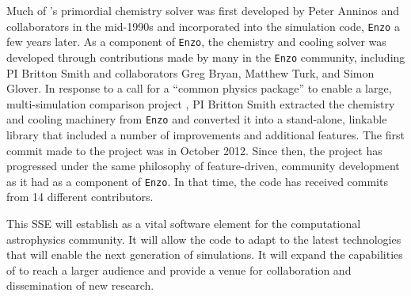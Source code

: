 Much of \grackle{}'s primordial chemistry solver was first developed
by Peter Anninos and collaborators in the mid-1990s
\citep{1997NewA....2..209A, 1997NewA....2..181A} and incorporated into
the simulation code, \texttt{Enzo} \citep[][licensed under the
  3-clause, revised BSD license]{2014ApJS..211...19B} a few
years later.  As a component of \texttt{Enzo}, the chemistry and
cooling solver was developed through contributions made by many in the
\texttt{Enzo} community, including PI Britton Smith and collaborators
Greg Bryan, Matthew Turk, and Simon Glover.  In response to a call for
a ``common physics package'' to enable a large, multi-simulation
comparison project \citep[AGORA,][]{2014ApJS..210...14K,
  2016ApJ...833..202K}, PI Britton Smith extracted the chemistry and
cooling machinery from \texttt{Enzo} and converted it into a
stand-alone, linkable library that included a number of improvements
and additional features.  The first commit made to the \grackle{}
project was in October 2012.  Since then, the project has progressed
under the same philosophy of feature-driven, community development as
it had as a component of \texttt{Enzo}.  In that time, the code has
received commits from 14 different contributors.

This SSE will establish \grackle{} as a vital software element for the
computational astrophysics community.  It will allow the code to adapt
to the latest technologies that will enable the next generation of
simulations.  It will expand the capabilities of \grackle{} to reach a
larger audience and provide a venue for collaboration and
dissemination of new research.
